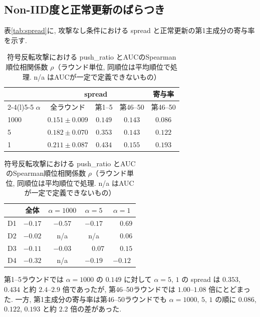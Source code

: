 \documentclass[a4j, dvipdfmx]{jsarticle}
\newcommand{\PushRatio}{\textrm{push\_ratio}}
\newcommand{\Spread}{\textrm{spread}}
\begin{document}
\subsection{Non-IID度と正常更新のばらつき}
\label{sec:res-spread}

表\ref{tab:spread}に, 攻撃なし条件における \Spread{} と正常更新の第1主成分の寄与率を示す.

\begin{table}[t]
\centering
\begin{minipage}[t]{0.52\textwidth}
\centering
\caption{攻撃なし条件における \Spread{} と正常更新の第1主成分の寄与率. 全ラウンドの値はラウンド単位の値の平均$\pm$標準偏差}
\label{tab:spread}
\small
\begin{tabular}{@{}lcccc@{}}
\toprule
 & \multicolumn{3}{c}{\Spread{}} & 寄与率 \\
\cmidrule(lr){2-4}\cmidrule(l){5-5}
$\alpha$ & 全ラウンド & 第1--5 & 第46--50 & 第46--50 \\
\midrule
1000 & $0.151 \pm 0.009$ & $0.149$ & $0.143$ & $0.086$ \\
5    & $0.182 \pm 0.070$ & $0.353$ & $0.143$ & $0.122$ \\
1    & $0.211 \pm 0.087$ & $0.434$ & $0.155$ & $0.193$ \\
\bottomrule
\end{tabular}
\end{minipage}\hfill
\begin{minipage}[t]{0.45\textwidth}
\centering
\caption{符号反転攻撃における \PushRatio{} とAUCのSpearman順位相関係数 $\rho$（ラウンド単位, 同順位は平均順位で処理. n/a はAUCが一定で定義できないもの）}
\label{tab:corr}
\small
\begin{tabular}{@{}lcccc@{}}
\toprule
 & 全体 & $\alpha=1000$ & $\alpha=5$ & $\alpha=1$ \\
\midrule
D1 & $-0.17$ & $-0.57$ & $-0.17$ & $\phantom{-}0.69$ \\
D2 & $-0.02$ & n/a & n/a & $\phantom{-}0.06$ \\
D3 & $-0.11$ & $-0.03$ & $\phantom{-}0.07$ & $\phantom{-}0.15$ \\
D4 & $-0.32$ & n/a & $-0.19$ & $-0.12$ \\
\bottomrule
\end{tabular}
\end{minipage}
\end{table}

第1--5ラウンドでは $\alpha=1000$ の $0.149$ に対して $\alpha=5,\,1$ の \Spread{} は $0.353$, $0.434$ と約 $2.4$--$2.9$ 倍であったが, 第46--50ラウンドでは $1.00$--$1.08$ 倍にとどまった. 一方, 第1主成分の寄与率は第46--50ラウンドでも $\alpha=1000,\,5,\,1$ の順に $0.086$, $0.122$, $0.193$ と約 $2.2$ 倍の差があった.
\end{document}
